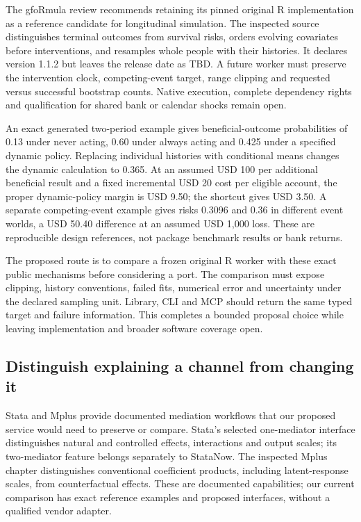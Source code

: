 The gfoRmula review recommends retaining its pinned original R
implementation as a reference candidate for longitudinal simulation. The
inspected source distinguishes terminal outcomes from survival risks,
orders evolving covariates before interventions, and resamples whole
people with their histories. It declares version 1.1.2 but leaves the
release date as TBD. A future worker must preserve the intervention
clock, competing-event target, range clipping and requested versus
successful bootstrap counts. Native execution, complete dependency
rights and qualification for shared bank or calendar shocks remain
open.\citep{exec20_gformula_reuse}

An exact generated two-period example gives beneficial-outcome
probabilities of 0.13 under never acting, 0.60 under always acting and
0.425 under a specified dynamic policy. Replacing individual histories
with conditional means changes the dynamic calculation to 0.365. At an
assumed USD 100 per additional beneficial result and a fixed incremental
USD 20 cost per eligible account, the proper dynamic-policy margin is
USD 9.50; the shortcut gives USD 3.50. A separate competing-event
example gives risks 0.3096 and 0.36 in different event worlds, a USD
50.40 difference at an assumed USD 1,000 loss. These are reproducible
design references, not package benchmark results or bank
returns.\citep{exec20_gformula_reference}

The proposed route is to compare a frozen original R worker with these
exact public mechanisms before considering a port. The comparison must
expose clipping, history conventions, failed fits, numerical error and
uncertainty under the declared sampling unit. Library, CLI and MCP
should return the same typed target and failure information. This
completes a bounded proposal choice while leaving implementation and
broader software coverage
open.\citep{exec20_gformula_reuse,exec20_gformula_reference}

\hypertarget{distinguish-explaining-a-channel-from-changing-it}{%
\subsection{Distinguish explaining a channel from changing
it}\label{distinguish-explaining-a-channel-from-changing-it}}

Stata and Mplus provide documented mediation workflows that our proposed
service would need to preserve or compare. Stata's selected one-mediator
interface distinguishes natural and controlled effects, interactions and
output scales; its two-mediator feature belongs separately to StataNow.
The inspected Mplus chapter distinguishes conventional coefficient
products, including latent-response scales, from counterfactual effects.
These are documented capabilities; our current comparison has exact
reference examples and proposed interfaces, without a qualified vendor
adapter.\citep{exec20_med_stata_one,exec20_med_stata_intro,exec20_med_stata_post,exec20_med_stata_multiple,exec20_med_mplus_ch17}

